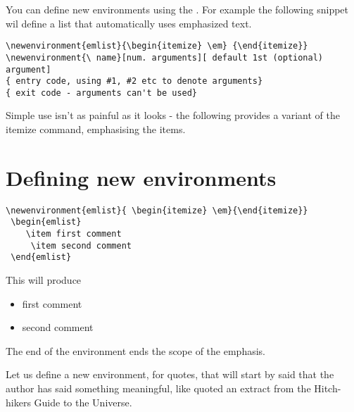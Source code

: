 You can define new environments using the . For example the following snippet wil define a list that automatically uses emphasized text.

\begin{Verbatim}
\newenvironment{emlist}{\begin{itemize} \em} {\end{itemize}}
\newenvironment{\ name}[num. arguments][ default 1st (optional) argument]
{ entry code, using #1, #2 etc to denote arguments} 
{ exit code - arguments can't be used}
\end{Verbatim}



Simple use isn't as painful as it looks - the following provides a variant of the itemize command, emphasising the items.

\section{Defining new environments}
\begin{verbatim}
\newenvironment{emlist}{ \begin{itemize} \em}{\end{itemize}}
 \begin{emlist}
    \item first comment
     \item second comment
 \end{emlist}
\end{verbatim}
   
This will produce

\newenvironment{emlist}{ \begin{itemize} \em}{\end{itemize}}
 \begin{emlist}
    \item first comment
     \item second comment
 \end{emlist}




The end of the environment ends the scope of the emphasis.

Let us define a new environment, for quotes, that will start by said that the author has said something meaningful, like quoted an extract from the Hitch-hikers Guide to the Universe.

\newenvironment{quotationX}[2][George]%
               {\par \ldots #1 \list{}{%
                           \em     %
                            \listparindent  \parindent
                           \itemindent    \listparindent%
                           \rightmargin   \leftmargin%
                           \setlength{\parsep}{2pt}
                          \setlength{\topsep}{10pt}
                         \ldots #2}%
                \item[] 
              }%
               {\endlist } %

